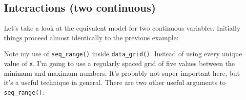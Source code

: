 \documentclass[]{book}
\newenvironment{Shaded}{\begin{snugshade}}{\end{snugshade}}
\newcommand{\KeywordTok}[1]{\textcolor[rgb]{0.13,0.29,0.53}{\textbf{{#1}}}}
\newcommand{\DataTypeTok}[1]{\textcolor[rgb]{0.13,0.29,0.53}{{#1}}}
\newcommand{\DecValTok}[1]{\textcolor[rgb]{0.00,0.00,0.81}{{#1}}}
\newcommand{\StringTok}[1]{\textcolor[rgb]{0.31,0.60,0.02}{{#1}}}
\newcommand{\CommentTok}[1]{\textcolor[rgb]{0.56,0.35,0.01}{\textit{{#1}}}}
\newcommand{\NormalTok}[1]{{#1}}
\begin{document}
\subsection{Interactions (two
continuous)}\label{interactions-two-continuous}

Let's take a look at the equivalent model for two continuous variables.
Initially things proceed almost identically to the previous example:

\begin{Shaded}
\end{Shaded}

Note my use of \texttt{seq\_range()} inside \texttt{data\_grid()}.
Instead of using every unique value of \texttt{x}, I'm going to use a
regularly spaced grid of five values between the minimum and maximum
numbers. It's probably not super important here, but it's a useful
technique in general. There are two other useful arguments to
\texttt{seq\_range()}:
\end{document}
